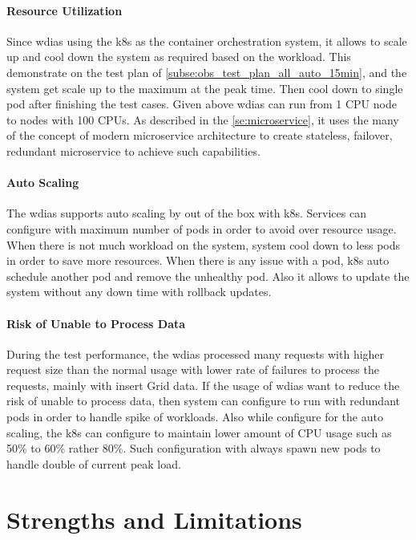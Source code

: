 \documentclass[conference]{IEEEtran}
\begin{document}
\paragraph{Resource Utilization}
Since \acrshort{wdias} using the \acrshort{k8s} as the container orchestration system, it allows to scale up and cool down the system as required based on the workload. This demonstrate on the test plan of \ref{subse:obs_test_plan_all_auto_15min}, and the system get scale up to the maximum at the peak time. Then cool down to single pod after finishing the test cases.
Given above \acrshort{wdias} can run from 1 CPU node to nodes with 100 CPUs. As described in the \ref{se:microservice}, it uses the many of the concept of modern microservice architecture to create stateless, failover, redundant microservice to achieve such capabilities.

\paragraph{Auto Scaling}
The \acrshort{wdias} supports auto scaling by out of the box with \acrshort{k8s}. Services can configure with maximum number of pods in order to avoid over resource usage. When there is not much workload on the system, system cool down to less pods in order to save more resources. When there is any issue with a pod, \acrshort{k8s} auto schedule another pod and remove the unhealthy pod. Also it allows to update the system without any down time with rollback updates.

\paragraph{Risk of Unable to Process Data}
During the test performance, the \acrshort{wdias} processed many requests with higher request size than the normal usage with lower rate of failures to process the requests, mainly with insert Grid data. If the usage of \acrshort{wdias} want to reduce the risk of unable to process data, then system can configure to run with redundant pods in order to handle spike of workloads. Also while configure for the auto scaling, the \acrshort{k8s} can configure to maintain lower amount of CPU usage such as 50\% to 60\% rather 80\%. Such configuration with always spawn new pods to handle double of current peak load.

\section{Strengths and Limitations}
\end{document}
